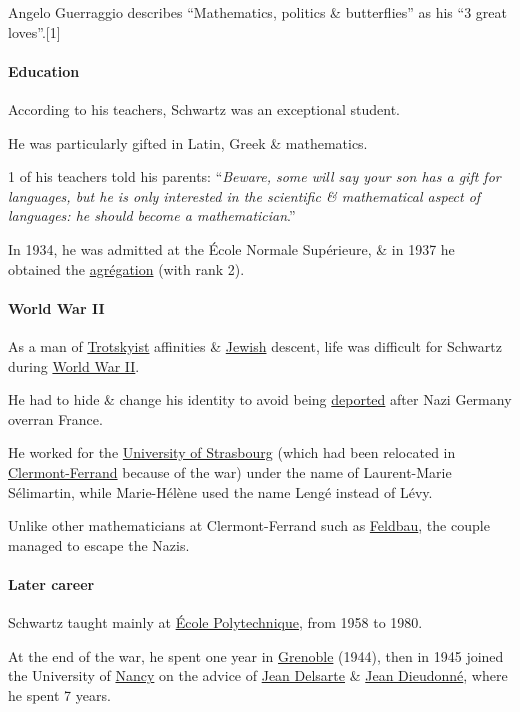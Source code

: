 \documentclass{article}
\begin{document}
%
Angelo Guerraggio describes ``Mathematics, politics \& butterflies'' as his ``3 great loves''.[1]

\paragraph{Education}
According to his teachers, Schwartz was an exceptional student.

He was particularly gifted in Latin, Greek \& mathematics.

1 of his teachers told his parents: ``\textit{Beware, some will say your son has a gift for languages, but he is only interested in the scientific \& mathematical aspect of languages: he should become a mathematician}.''

%
In 1934, he was admitted at the École Normale Supérieure, \& in 1937 he obtained the \href{https://en.wikipedia.org/wiki/Agr%C3%A9gation}{agrégation} (with rank 2).

\paragraph{World War II}
As a man of \href{https://en.wikipedia.org/wiki/Trotskyism}{Trotskyist} affinities \& \href{https://en.wikipedia.org/wiki/Jew}{Jewish} descent, life was difficult for Schwartz during \href{https://en.wikipedia.org/wiki/World_War_II}{World War II}.

He had to hide \& change his identity to avoid being \href{https://en.wikipedia.org/wiki/Deportation}{deported} after Nazi Germany overran France.

He worked for the \href{https://en.wikipedia.org/wiki/University_of_Strasbourg}{University of Strasbourg} (which had been relocated in \href{https://en.wikipedia.org/wiki/Clermont-Ferrand}{Clermont-Ferrand} because of the war) under the name of Laurent-Marie Sélimartin, while Marie-Hélène used the name Lengé instead of Lévy.

Unlike other mathematicians at Clermont-Ferrand such as \href{https://en.wikipedia.org/wiki/Jacques_Feldbau}{Feldbau}, the couple managed to escape the Nazis.

\paragraph{Later career}
Schwartz taught mainly at \href{https://en.wikipedia.org/wiki/%C3%89cole_Polytechnique}{École Polytechnique}, from 1958 to 1980.

At the end of the war, he spent one year in \href{https://en.wikipedia.org/wiki/Grenoble}{Grenoble} (1944), then in 1945 joined the University of \href{https://en.wikipedia.org/wiki/Nancy,_France}{Nancy} on the advice of \href{https://en.wikipedia.org/wiki/Jean_Delsarte}{Jean Delsarte} \& \href{https://en.wikipedia.org/wiki/Jean_Dieudonn%C3%A9}{Jean Dieudonné}, where he spent 7 years.
\end{document}
